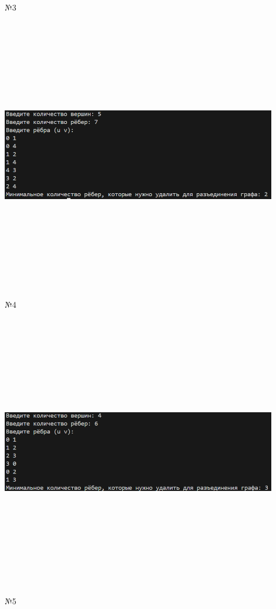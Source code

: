 \documentclass[12pt]{article}
\begin{document}
\par №3
\par \includegraphics[width=0.9\textwidth, height=12cm, keepaspectratio]{res3.png}
\par №4
\par \includegraphics[width=0.9\textwidth, height=12cm, keepaspectratio]{res4.png}
\par №5
\end{document}
